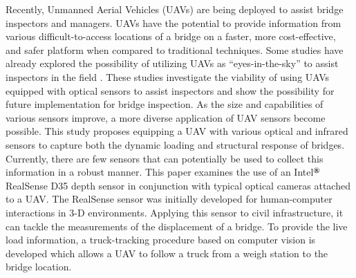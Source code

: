 \documentclass{sigchi}
\begin{document}
Recently, Unmanned Aerial Vehicles (UAVs) are being deployed to assist bridge inspectors and managers. UAVs have the potential to provide information from various difficult-to-access locations of a bridge on a faster, more cost-effective, and safer platform when compared to traditional techniques. Some studies have already explored the possibility of utilizing UAVs as ``eyes-in-the-sky'' to assist inspectors in the field \cite{Gillins2016,Wells2018}. These studies investigate the viability of using UAVs equipped with optical sensors to assist inspectors and show the possibility for future implementation for bridge inspection. As the size and capabilities of various sensors improve, a more diverse application of UAV sensors become possible. This study proposes equipping a UAV with various optical and infrared sensors to capture both the dynamic loading and structural response of bridges. Currently, there are few sensors that can potentially be used to collect this information in a robust manner. This paper examines the use of an Intel$^{\text{\textregistered}}$ RealSense D35 depth sensor in conjunction with typical optical cameras attached to a UAV. The RealSense sensor was initially developed for human-computer interactions in 3-D environments. Applying this sensor to civil infrastructure, it can tackle the measurements of the displacement of a bridge. To provide the live load information, a truck-tracking procedure based on computer vision is developed which allows a UAV to follow a truck from a weigh station to the bridge location.
\end{document}
